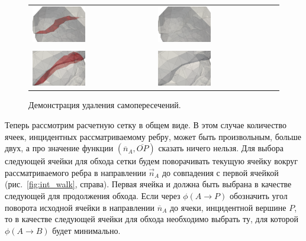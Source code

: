 \begin{figure}[ht]
\centering
\begin{tabular}{ll}
\includegraphics[width=0.45\textwidth]{fig/int_self_intersection_on.png}
&
\includegraphics[width=0.45\textwidth]{fig/int_self_intersection_off.png} \\
\\
\includegraphics[width=0.45\textwidth]{fig/int_self_intersection_on_2.png}
&
\includegraphics[width=0.45\textwidth]{fig/int_self_intersection_off_2.png}
\end{tabular}
\singlespacing
{}\caption{Демонстрация удаления самопересечений.}
\label{fig:text_1_int_selfintoff2}
\end{figure}

Теперь рассмотрим расчетную сетку в общем виде.
В этом случае количество ячеек, инцидентных рассматриваемому ребру, может быть произвольным, больше двух, а про значение функции $(\overline{n}_A, \overline{OP})$ сказать ничего нельзя.
Для выбора следующей ячейки для обхода сетки будем поворачивать текущую ячейку вокруг рассматриваемого ребра в направлении $\vec{n}_A$ до совпадения с первой ячейкой (рис.~\ref{fig:int_walk}, справа).
Первая ячейка и должна быть выбрана в качестве следующей для продолжения обхода.
Если через $\phi(A \rightarrow P)$  обозначить угол поворота исходной ячейки в направлении $\overline{n}_A$ до ячеки, инцидентной вершине $P$, то в качестве следующей ячейки для обхода необходимо выбрать ту, для которой $\phi(A \rightarrow B)$ будет минимально.

